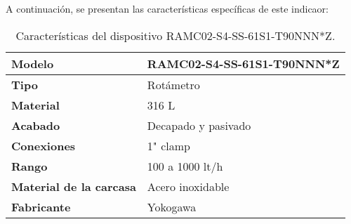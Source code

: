 A continuación, se presentan las características específicas de este indicaor:\\



\begin{table}[H]
    \centering
    \caption{Características del dispositivo RAMC02-S4-SS-61S1-T90NNN*Z.}
    \label{table:indicador_flujo}
    \begin{tabular}{| L{6cm} | L{6cm} |}

        \hline
        \textbf{Modelo}                 & RAMC02-S4-SS-61S1-T90NNN*Z \\
        \hline
        \textbf{Tipo}                   & Rotámetro                  \\
        \hline
        \textbf{Material}               & 316 L                      \\
        \hline
        \textbf{Acabado}                & Decapado y pasivado        \\
        \hline
        \textbf{Conexiones}             & 1" clamp                   \\
        \hline
        \textbf{Rango}                  & 100 a 1000 lt/h            \\
        \hline
        \textbf{Material de la carcasa} & Acero inoxidable           \\
        \hline
        \textbf{Fabricante}             & Yokogawa                   \\
        \hline
    \end{tabular}
\end{table}

